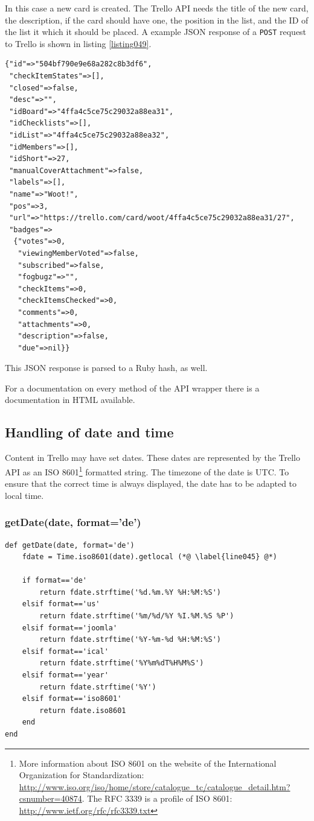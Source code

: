 In this case a new card is created. The Trello API needs the title of the new card, the description, if the card should have one, the position in the list, and the ID of the list it which it should be placed. A example JSON response of a \texttt{POST} request to Trello is shown in listing \ref{listing049}.

\begin{lstlisting}[aboveskip=1\baselineskip, style=bash, caption=JSON response of a \texttt{POST} request., label=listing049]
{"id"=>"504bf790e9e68a282c8b3df6",
 "checkItemStates"=>[],
 "closed"=>false,
 "desc"=>"",
 "idBoard"=>"4ffa4c5ce75c29032a88ea31",
 "idChecklists"=>[],
 "idList"=>"4ffa4c5ce75c29032a88ea32",
 "idMembers"=>[],
 "idShort"=>27,
 "manualCoverAttachment"=>false,
 "labels"=>[],
 "name"=>"Woot!",
 "pos"=>3,
 "url"=>"https://trello.com/card/woot/4ffa4c5ce75c29032a88ea31/27",
 "badges"=>
  {"votes"=>0,
   "viewingMemberVoted"=>false,
   "subscribed"=>false,
   "fogbugz"=>"",
   "checkItems"=>0,
   "checkItemsChecked"=>0,
   "comments"=>0,
   "attachments"=>0,
   "description"=>false,
   "due"=>nil}}
\end{lstlisting}
This JSON response is parsed to a Ruby hash, as well.

For a documentation on every method of the API wrapper there is a documentation in HTML available.

\subsection{Handling of date and time}
Content in Trello may have set dates. These dates are represented by the Trello API as an ISO 8601\footnote{More information about ISO 8601 on the website of the International Organization for Standardization: \url{http://www.iso.org/iso/home/store/catalogue_tc/catalogue_detail.htm?csnumber=40874}. The RFC 3339 is a profile of ISO 8601: \url{http://www.ietf.org/rfc/rfc3339.txt}} formatted string. The timezone of the date is UTC. To ensure that the correct time is always displayed, the date has to be adapted to local time. 

\subsubsection{getDate(date, format='de')}
\begin{lstlisting}[aboveskip=1\baselineskip, caption=\lstinline{getDate()}, label=listing044]
def getDate(date, format='de')
	fdate = Time.iso8601(date).getlocal (*@ \label{line045} @*)
	
	if format=='de'
		return fdate.strftime('%d.%m.%Y %H:%M:%S')
	elsif format=='us'
		return fdate.strftime('%m/%d/%Y %I.%M.%S %P')
	elsif format=='joomla'
		return fdate.strftime('%Y-%m-%d %H:%M:%S')
	elsif format=='ical'
		return fdate.strftime('%Y%m%dT%H%M%S')
	elsif format=='year'
		return fdate.strftime('%Y')
	elsif format=='iso8601'
		return fdate.iso8601
	end
end
\end{lstlisting}

